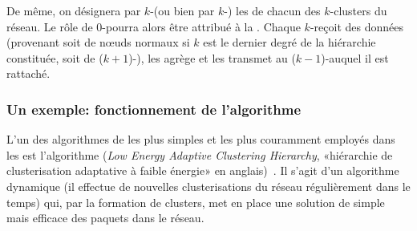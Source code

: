 De même, on désignera par $k$-\ch (ou bien par $k$-\CH) les \chs de chacun des $k$-clusters du réseau.
Le rôle de $0$-\CH pourra alors être attribué à la \sdb.
Chaque $k$-\CH reçoit des données (provenant soit de nœuds normaux si $k$ est le dernier degré de la hiérarchie constituée, soit de ($k+1$)-\CH), les agrège et les transmet au ($k-1$)-\CH auquel il est rattaché.

        \subsubsection{Un exemple: fonctionnement de l'algorithme \leach}\label{st:subsubsec:leach}
L'un des algorithmes de  les plus simples et les plus couramment employés dans les \rcsfs est l'algorithme \leach (\textit{Low Energy Adaptive Clustering Hierarchy}, \cad «hiérarchie de clusterisation adaptative à faible énergie» en anglais)~\cite{HCB00}.
Il s'agit d'un algorithme dynamique (il effectue de nouvelles clusterisations du réseau régulièrement dans le temps) qui, par la formation de clusters, met en place une solution de  simple mais efficace des paquets dans le réseau.

